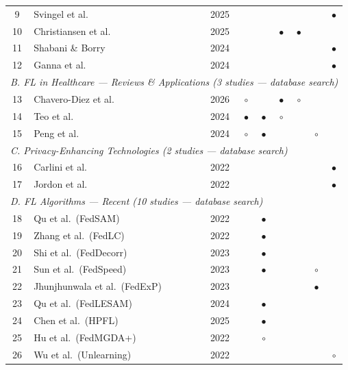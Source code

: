 \documentclass[conference]{IEEEtran}
\begin{document}
\begin{table}[htbp]
\begin{tabular}{clccccccc}
9 & Svingel et al.~\cite{svingel2025hdab} & 2025 & & & & & & $\bullet$ \\
10 & Christiansen et al.~\cite{christiansen2025pilot} & 2025 & & & $\bullet$ & $\bullet$ & & \\
11 & Shabani \& Borry~\cite{shabani2024ehds} & 2024 & & & & & & $\bullet$ \\
12 & Ganna et al.~\cite{ganna2024boost} & 2024 & & & & & & $\bullet$ \\
\midrule
\multicolumn{9}{l}{\textit{B. FL in Healthcare --- Reviews \& Applications (3 studies --- database search)}} \\
\midrule
13 & Chavero-Diez et al.~\cite{chaverodiez2026fair} & 2026 & $\circ$ & & $\bullet$ & $\circ$ & & \\
14 & Teo et al.~\cite{teo2024systematic} & 2024 & $\bullet$ & $\bullet$ & $\circ$ & & & \\
15 & Peng et al.~\cite{peng2024systematic} & 2024 & $\circ$ & $\bullet$ & & & $\circ$ & \\
\midrule
\multicolumn{9}{l}{\textit{C. Privacy-Enhancing Technologies (2 studies --- database search)}} \\
\midrule
16 & Carlini et al.~\cite{carlini2022privacy} & 2022 & & & & & & $\bullet$ \\
17 & Jordon et al.~\cite{jordon2022synthetic} & 2022 & & & & & & $\bullet$ \\
\midrule
\multicolumn{9}{l}{\textit{D. FL Algorithms --- Recent (10 studies --- database search)}} \\
\midrule
18 & Qu et al.\ (FedSAM)~\cite{qu2022fedsam} & 2022 & & $\bullet$ & & & & \\
19 & Zhang et al.\ (FedLC)~\cite{zhang2022fedlc} & 2022 & & $\bullet$ & & & & \\
20 & Shi et al.\ (FedDecorr)~\cite{shi2023feddecorr} & 2023 & & $\bullet$ & & & & \\
21 & Sun et al.\ (FedSpeed)~\cite{sun2023fedspeed} & 2023 & & $\bullet$ & & & $\circ$ & \\
22 & Jhunjhunwala et al.\ (FedExP)~\cite{jhunjhunwala2023fedexp} & 2023 & & & & & $\bullet$ & \\
23 & Qu et al.\ (FedLESAM)~\cite{qu2024fedlesam} & 2024 & & $\bullet$ & & & & \\
24 & Chen et al.\ (HPFL)~\cite{chen2025hpfl} & 2025 & & $\bullet$ & & & & \\
25 & Hu et al.\ (FedMGDA+)~\cite{hu2022fedmgda} & 2022 & & $\circ$ & & & & \\
26 & Wu et al.\ (Unlearning)~\cite{wu2022fedunlearn} & 2022 & & & & & & $\circ$ \\

\end{tabular}
\end{table}
\end{document}
